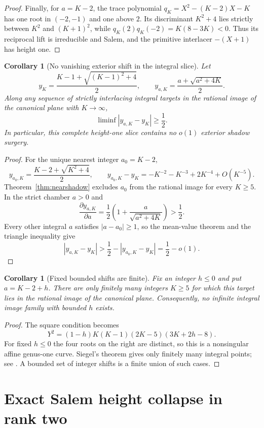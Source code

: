 \documentclass[11pt,reqno]{amsart}
\newtheorem{corollary}[theorem]{Corollary}
\theoremstyle{definition}
\theoremstyle{remark}
\begin{document}
\begin{proof}
Finally, for $a=K-2$, the trace polynomial
$q_K=X^2-(K-2)X-K$ has one root in $(-2,-1)$ and one above $2$.
Its discriminant $K^2+4$ lies strictly between $K^2$ and $(K+1)^2$, while
$q_K(2)q_K(-2)=K(8-3K)<0$.  Thus its reciprocal lift is irreducible and
Salem, and the primitive interlacer $-(X+1)$ has height one.
\end{proof}

\begin{corollary}[No vanishing exterior shift in the integral slice]
\label{cor:novanishingshift}
Let
\[
 y_K=\frac{K-1+\sqrt{(K-1)^2+4}}2,
 \qquad y_{a,K}=\frac{a+\sqrt{a^2+4K}}2.
\]
Along any sequence of strictly interlacing integral targets in the rational
image of the canonical plane with $K\to\infty$,
\[
 \liminf |y_{a,K}-y_K|\geq\frac12.
\]
In particular, this complete height-one slice contains no $o(1)$ exterior
shadow surgery.
\end{corollary}

\begin{proof}
For the unique nearest integer $a_0=K-2$,
\[
 y_{a_0,K}=\frac{K-2+\sqrt{K^2+4}}2,
 \qquad
 y_{a_0,K}-y_K=-K^{-2}-K^{-3}+2K^{-4}+O(K^{-5}).
\]
Theorem~\ref{thm:nearshadow} excludes $a_0$ from the rational image for
every $K\geq5$.  In the strict chamber $a>0$ and
\[
 \frac{\partial y_{a,K}}{\partial a}
 =\frac12\left(1+\frac{a}{\sqrt{a^2+4K}}\right)>\frac12.
\]
Every other integral $a$ satisfies $|a-a_0|\geq1$, so the mean-value theorem
and the triangle inequality give
\[
 |y_{a,K}-y_K|>\frac12-|y_{a_0,K}-y_K|=\frac12-o(1).
\]
\end{proof}

\begin{corollary}[Fixed bounded shifts are finite]
\label{cor:boundedshift}
Fix an integer $h\leq0$ and put $a=K-2+h$.  There are only finitely many
integers $K\geq5$ for which this target lies in the rational image of the
canonical plane.  Consequently, no infinite integral image family with
bounded $h$ exists.
\end{corollary}

\begin{proof}
The square condition becomes
\[
 Y^2=(1-h)K(K-1)(2K-5)(3K+2h-8).
\]
For fixed $h\leq0$ the four roots on the right are distinct, so this is a
nonsingular affine genus-one curve.  Siegel's theorem gives only finitely
many integral points; see \cite[Chapter~IX]{silverman}.  A bounded set of
integer shifts is a finite union of such cases.
\end{proof}

\section{Exact Salem height collapse in rank two}
\end{document}
